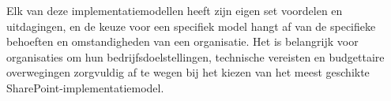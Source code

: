 Elk van deze implementatiemodellen heeft zijn eigen set voordelen en uitdagingen, en de keuze voor een specifiek model hangt af van de specifieke behoeften en omstandigheden van een organisatie. Het is belangrijk voor organisaties om hun bedrijfsdoelstellingen, technische vereisten en budgettaire overwegingen zorgvuldig af te wegen bij het kiezen van het meest geschikte SharePoint-implementatiemodel.













